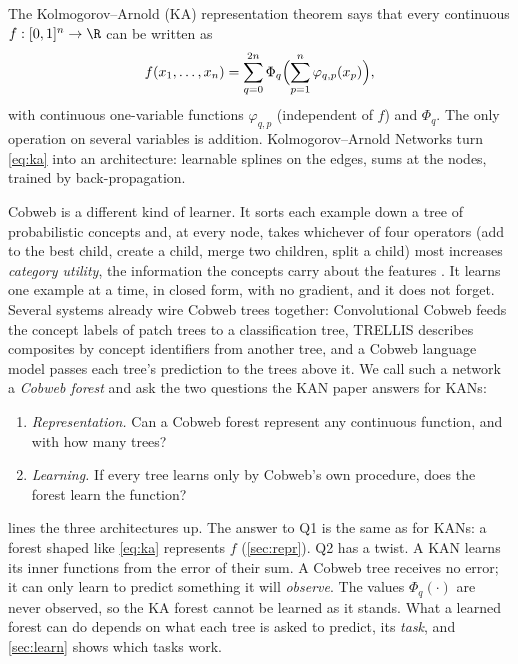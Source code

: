 The Kolmogorov--Arnold (KA) representation theorem
\citep{kolmogorov1957,arnold1957,lorentz1966,sprecher1965} says that every continuous
$f:[0,1]^n\to\R$ can be written as
\begin{equation}\label{eq:ka}
  f(x_1,\dots,x_n)=\sum_{q=0}^{2n}\Phi_q\Bigl(\sum_{p=1}^{n}\varphi_{q,p}(x_p)\Bigr),
\end{equation}
with continuous one-variable functions $\varphi_{q,p}$ (independent of $f$) and $\Phi_q$.
The only operation on several variables is addition.  Kolmogorov--Arnold Networks
\citep{liu2024kan} turn \eqref{eq:ka} into an architecture: learnable splines on the
edges, sums at the nodes, trained by back-propagation.

Cobweb \citep{fisher1987} is a different kind of learner.  It sorts each example down a
tree of probabilistic concepts and, at every node, takes whichever of four operators
(add to the best child, create a child, merge two children, split a child) most
increases \emph{category utility}, the information the concepts carry about the features
\citep{corter1992,maclellan2026rational}.  It learns one example at a time, in closed
form, with no gradient, and it does not forget.  Several systems already wire Cobweb
trees together: Convolutional Cobweb \citep{maclellan2021conv} feeds the concept labels
of patch trees to a classification tree, TRELLIS \citep{singaravadivelan2026trellis}
describes composites by concept identifiers from another tree, and a Cobweb language
model passes each tree's prediction to the trees above it.  We call such a network a
\emph{Cobweb forest} and ask the two questions the KAN paper answers for KANs:
\begin{enumerate}[label=\textbf{Q\arabic*.},leftmargin=*,noitemsep]
\item \emph{Representation.} Can a Cobweb forest represent any continuous function, and
  with how many trees?
\item \emph{Learning.} If every tree learns only by Cobweb's own procedure, does the
  forest learn the function?
\end{enumerate}

 lines the three architectures up.  The answer to Q1 is the same as
for KANs: a forest shaped like \eqref{eq:ka} represents $f$ (\cref{sec:repr}).  Q2 has a
twist.  A KAN learns its inner functions from the error of their sum.  A Cobweb tree
receives no error; it can only learn to predict something it will \emph{observe}.  The
values $\Phi_q(\cdot)$ are never observed, so the KA forest cannot be learned as it
stands.  What a learned forest can do depends on what each tree is asked to predict, its
\emph{task}, and \cref{sec:learn} shows which tasks work.

